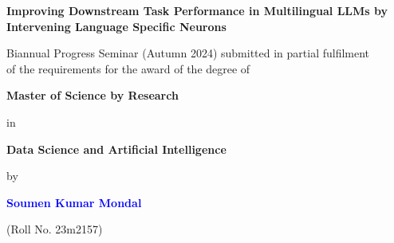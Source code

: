 
\thispagestyle{empty}
\singlespacing
\begin{titlepage}
\begin{center}
    \centering
     
      
  {{\Large \textbf{Improving Downstream Task Performance in Multilingual LLMs by Intervening Language Specific Neurons}\par}}
     
    \vspace{1cm}
    {Biannual Progress Seminar (Autumn 2024) submitted in partial fulfilment\\ of the requirements for the award of the degree of \par}
    \vspace{0.1cm}
    {
    \textbf{\large Master of Science by Research} \par}
    \vspace{0.1cm}
    {in \par}
    \vspace{0.1cm}
    {\textbf{Data Science and Artificial Intelligence} \par}
    \vspace{0.1cm}

		
    {by\par}
    \vspace{0.1cm}
    {\large \textbf{\textcolor{blue}{Soumen Kumar Mondal}}\par} 
    (Roll No. 23m2157)
    \vspace{0.1cm}
    

\end{center}
\end{titlepage}
